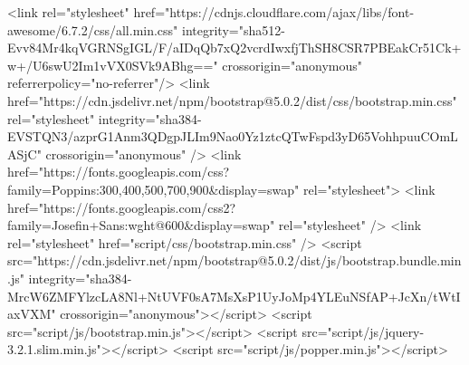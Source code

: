 <link rel="stylesheet" href="https://cdnjs.cloudflare.com/ajax/libs/font-awesome/6.7.2/css/all.min.css" integrity="sha512-Evv84Mr4kqVGRNSgIGL/F/aIDqQb7xQ2vcrdIwxfjThSH8CSR7PBEakCr51Ck+w+/U6swU2Im1vVX0SVk9ABhg==" crossorigin="anonymous" referrerpolicy="no-referrer"/>
<link href="https://cdn.jsdelivr.net/npm/bootstrap@5.0.2/dist/css/bootstrap.min.css" rel="stylesheet" integrity="sha384-EVSTQN3/azprG1Anm3QDgpJLIm9Nao0Yz1ztcQTwFspd3yD65VohhpuuCOmLASjC" crossorigin="anonymous" />
<link href="https://fonts.googleapis.com/css?family=Poppins:300,400,500,700,900&display=swap" rel="stylesheet">
<link href="https://fonts.googleapis.com/css2?family=Josefin+Sans:wght@600&display=swap" rel="stylesheet" />
<link rel="stylesheet" href="script/css/bootstrap.min.css" />
<script src="https://cdn.jsdelivr.net/npm/bootstrap@5.0.2/dist/js/bootstrap.bundle.min.js" integrity="sha384-MrcW6ZMFYlzcLA8Nl+NtUVF0sA7MsXsP1UyJoMp4YLEuNSfAP+JcXn/tWtIaxVXM" crossorigin="anonymous"></script>
<script src="script/js/bootstrap.min.js"></script>
<script src="script/js/jquery-3.2.1.slim.min.js"></script>
<script src="script/js/popper.min.js"></script>